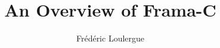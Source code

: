 \documentclass[pdf,xcolor={svgnames}]{beamer}
\title[An Overview of Frama-C]{An Overview of Frama-C}
\institute[NAU -- SICCS]{
  \texttt{[image: nau\_logo.png]}
}
\author{Fr\'ed\'eric Loulergue}
\begin{document}
\begin{frame}
  \maketitle
\end{frame}










% 
\end{document}
